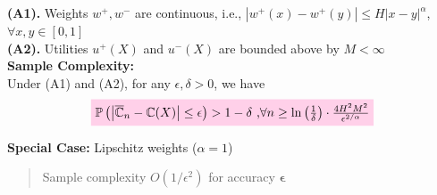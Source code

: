 \documentclass{beamer}
\begin{document}
\begin{frame}{	}

\vspace{3ex}

\begin{small}

{\textbf{(A1).}  Weights $w^+, w^-$ are \alert{\holder continuous}, i.e., $| w^+(x) - w^+(y) | \leq H | x-y |^{\alpha}$, $\forall x,y \in [0,1]$}\\[2ex]
{\textbf{(A2).}  Utilities $u^+(X)$ and $u^-(X)$ are bounded above by $M<\infty$}\\[4ex]

{\color{blue}\textbf{Sample Complexity:}}\\[1ex]
Under (A1) and (A2), for any $\epsilon, \delta >0$, we have
\begin{align*}
\tikz[baseline]{
            \node[fill=pink!20,anchor=base] (t1)
            {
$\Prob{\left |\overline \C_n- \C(X) \right| \leq  \epsilon } >1- \delta\text{     ,} \forall n \geq \ln\left(\frac{1}{\delta}\right)\cdot 
\frac{4H^2 M^2}{\epsilon^{2/\alpha}}$};}
\end{align*}

\vspace{3ex}
\pause

{\color{darkgreen}\textbf{Special Case:}} Lipschitz weights ($\alpha=1$) \\[1ex]
\begin{quote}
Sample complexity \alert{$O\left(1/\epsilon^2\right)$} for accuracy {\color{upmaroon} $\bm{\epsilon}$}
\end{quote}
\end{small}
\end{frame}


\end{document}
